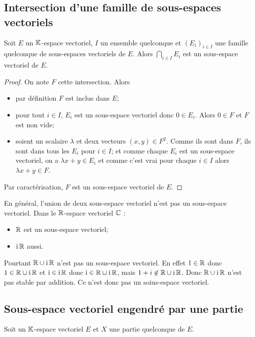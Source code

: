 \subsection{Intersection d'une famille de sous-espaces vectoriels}

\begin{theo}
  Soit \(E\) un \(\mathbb{K}\)-espace vectoriel, \(I\) un ensemble quelconque et \((E_i)_{i \in I}\) une famille quelconque de sous-espaces vectoriels de \(E\). Alors \(\bigcap_{i \in I} E_i\) est un sous-espace vectoriel de \(E\).
\end{theo}
\begin{proof}
  On note \(F\) cette intersection. Alors
  \begin{itemize}
  \item par définition \(F\) est inclus dans \(E\);
  \item pour tout \(i \in I\), \(E_i\) est un sous-espace vectoriel donc \(0 \in E_i\). Alors \(0 \in F\) et \(F\) est non vide;
  \item soient un scalaire \(\lambda\) et deux vecteurs \((x,y) \in F^2\). Comme ils sont dans \(F\), ils sont dans tous les \(E_i\) pour \(i \in I\); et comme chaque \(E_i\) est un sous-espace vectoriel, on a \(\lambda x +y \in E_i\) et comme c'est vrai pour chaque \(i \in I\) alors \(\lambda x +y \in F\).
  \end{itemize}
  Par caractérisation, \(F\) est un sous-espace vectoriel de \(E\).
\end{proof}
%
En général, l'union de deux sous-espace vectoriel n'est pas un sous-espace vectoriel. Dans le \(\mathbb{R}\)-espace vectoriel \(\mathbb{C}\) :
\begin{itemize}
\item \(\mathbb{R}\) est un sous-espace vectoriel;
\item \(\operatorname{i}\mathbb{R}\) aussi.
\end{itemize}
Pourtant \(\mathbb{R} \cup \operatorname{i}\mathbb{R}\) n'est pas un sous-espace vectoriel. En effet \(1 \in \mathbb{R}\) donc \(1 \in \mathbb{R} \cup \operatorname{i}\mathbb{R}\) et \(\operatorname{i} \in \operatorname{i}\mathbb{R}\) donc \(\operatorname{i} \in \mathbb{R}\cup \operatorname{i}\mathbb{R}\), mais \(1+i \not\in \mathbb{R}\cup\operatorname{i}\mathbb{R}\). Donc \(\mathbb{R}\cup\operatorname{i}\mathbb{R}\) n'est pas stable par addition. Ce n'est donc pas un soius-espace vectoriel.

\subsection{Sous-espace vectoriel engendré par une partie}

Soit un \(\mathbb{K}\)-espace vectoriel \(E\) et \(X\) une partie quelconque de \(E\).


